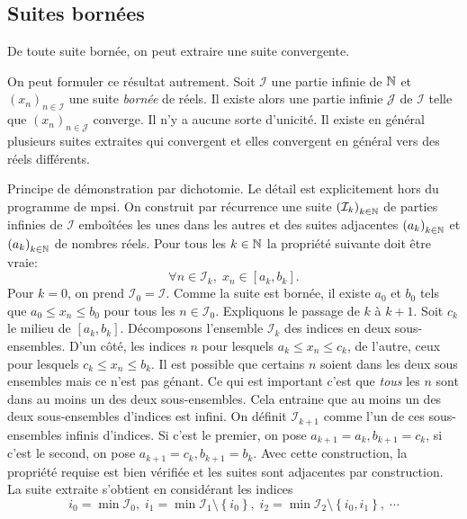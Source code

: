 \subsection{Suites bornées}
\begin{thmn}
 De toute suite bornée, on peut extraire une suite convergente.
\end{thmn}
On peut formuler ce résultat autrement. Soit $\mathcal I$ une partie infinie de $\mathbb{N}$ et $(x_n)_{n\in\mathcal I}$ une suite \emph{bornée} de réels. Il existe alors une partie infinie $\mathcal J$ de $\mathcal I$ telle que $(x_n)_{n\in\mathcal J}$ converge. Il n'y a aucune sorte d'unicité. Il existe en général plusieurs suites extraites qui convergent et elles convergent en général vers des réels différents.
\begin{demo}
  Principe de démonstration par dichotomie. Le détail est explicitement hors du programme de mpsi.\newline
On construit par récurrence une suite $\left( \mathcal{I}_k\right)_{k\in \mathbb{N}}$ de parties infinies de $\mathcal{I}$ emboîtées les unes dans les autres et des suites adjacentes $\left( a_k \right)_{k \in \mathbb{N}}$ et $\left( a_k \right)_{k \in \mathbb{N}}$ de nombres réels. Pour tous les $k\in \mathbb{N}$ la propriété suivante doit être vraie:
\[
 \forall n \in \mathcal{I}_k, \; x_n \in \left[ a_k, b_k\right]. 
\]
Pour $k=0$, on prend $\mathcal{I}_0 = \mathcal{I}$. Comme la suite est bornée, il existe $a_0$ et $b_0$ tels que $a_0 \leq x_n \leq b_0$ pour tous les $n\in \mathcal{I}_0$.\newline
Expliquons le passage de $k$ à $k+1$.\newline
Soit $c_k$ le milieu de $\left[ a_k , b_k\right]$. Décomposons l'ensemble $\mathcal{I}_k$ des indices en deux sous-ensembles. D'un côté, les indices $n$ pour lesquels $a_k\leq x_n \leq c_k$, de l'autre, ceux pour lesquels $c_k \leq x_n \leq b_k$. Il est possible que certains $n$ soient dans les deux sous ensembles mais ce n'est pas génant. Ce qui est important c'est que \emph{tous} les $n$ sont dans au moins un des deux sous-ensembles. Cela entraine que au moins un des deux sous-ensembles d'indices est infini. On définit $\mathcal{I}_{k+1}$ comme l'un de ces sous-ensembles infinis d'indices. Si c'est le premier, on pose $a_{k+1}=a_k, b_{k+1}=c_k$, si c'est le second, on pose $a_{k+1}=c_k, b_{k+1}=b_k$.\newline
Avec cette construction, la propriété requise est bien vérifiée et les suites sont adjacentes par construction. La suite extraite s'obtient en considérant les indices 
\[
 i_0 = \min \mathcal{I}_0, \; i_1 = \min \mathcal{I}_1 \setminus \left\lbrace i_0\right\rbrace  
 , \; i_2 = \min \mathcal{I}_2 \setminus \left\lbrace i_0, i_1\right\rbrace ,\; \cdots 
\]
\end{demo}


